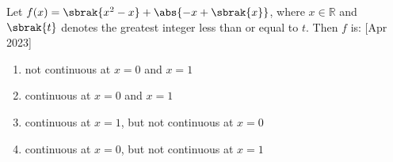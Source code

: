 	\item
	Let $f(x) = \sbrak{x^2 - x} + \abs{-x + \sbrak{x}}$, where $x \in \mathbb{R}$ and $\sbrak{t}$ denotes the greatest integer less than or equal to $t$. Then $f$ is:
	\hfill [Apr 2023]
		\begin{enumerate}
			\item not continuous at $x = 0$ and $x = 1$
			\item continuous at $x = 0$ and $x = 1$
			\item continuous at $x = 1$, but not continuous at $x = 0$
			\item continuous at $x = 0$, but not continuous at $x = 1$
		\end{enumerate}
